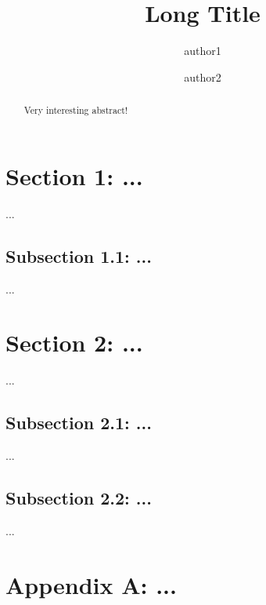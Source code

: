 \documentclass[a4paper,11pt,reqno]{amsart}
\theoremstyle{plain}
\theoremstyle{remark}
\begin{document}
\title[short title]{Long Title} 
\author{author1}
\author{author2}
\address{Institut f\"ur Mathematik, Universit\"at Paderborn, Paderborn, Germany}

\begin{abstract}
Very interesting abstract!
\end{abstract}

\maketitle


\setcounter{tocdepth}{2}
\tableofcontents


\section{Section 1: ...} \label{sec1}

... \nocite{foellinger.2022}



\subsection{Subsection 1.1: ...} \label{sec1.1}

...


\section{Section 2: ...} \label{sec2}

...


\subsection{Subsection 2.1: ...} \label{sec2.1}

...


\subsection{Subsection 2.2: ...} \label{sec2.2}

...



\appendix

\section{Appendix A: ...} \label{appA}








\bigskip

\end{document}
